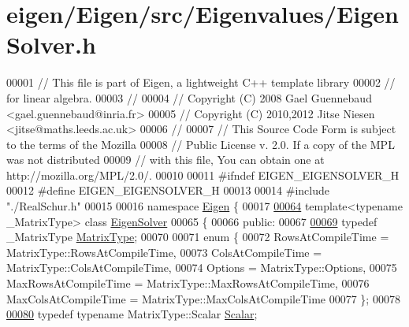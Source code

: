 \hypertarget{eigen_2_eigen_2src_2_eigenvalues_2_eigen_solver_8h_source}{}\section{eigen/\+Eigen/src/\+Eigenvalues/\+Eigen\+Solver.h}
\label{eigen_2_eigen_2src_2_eigenvalues_2_eigen_solver_8h_source}

\begin{DoxyCode}
00001 \textcolor{comment}{// This file is part of Eigen, a lightweight C++ template library}
00002 \textcolor{comment}{// for linear algebra.}
00003 \textcolor{comment}{//}
00004 \textcolor{comment}{// Copyright (C) 2008 Gael Guennebaud <gael.guennebaud@inria.fr>}
00005 \textcolor{comment}{// Copyright (C) 2010,2012 Jitse Niesen <jitse@maths.leeds.ac.uk>}
00006 \textcolor{comment}{//}
00007 \textcolor{comment}{// This Source Code Form is subject to the terms of the Mozilla}
00008 \textcolor{comment}{// Public License v. 2.0. If a copy of the MPL was not distributed}
00009 \textcolor{comment}{// with this file, You can obtain one at http://mozilla.org/MPL/2.0/.}
00010 
00011 \textcolor{preprocessor}{#ifndef EIGEN\_EIGENSOLVER\_H}
00012 \textcolor{preprocessor}{#define EIGEN\_EIGENSOLVER\_H}
00013 
00014 \textcolor{preprocessor}{#include "./RealSchur.h"}
00015 
00016 \textcolor{keyword}{namespace }\hyperlink{namespace_eigen}{Eigen} \{ 
00017 
\hyperlink{group___eigenvalues___module}{00064} \textcolor{keyword}{template}<\textcolor{keyword}{typename} \_MatrixType> \textcolor{keyword}{class }\hyperlink{group___eigenvalues___module_class_eigen_1_1_eigen_solver}{EigenSolver}
00065 \{
00066   \textcolor{keyword}{public}:
00067 
\hyperlink{group___eigenvalues___module_a83acd180404ddaac8a678fa65a6b632b}{00069}     \textcolor{keyword}{typedef} \_MatrixType \hyperlink{group___eigenvalues___module_a83acd180404ddaac8a678fa65a6b632b}{MatrixType};
00070 
00071     \textcolor{keyword}{enum} \{
00072       RowsAtCompileTime = MatrixType::RowsAtCompileTime,
00073       ColsAtCompileTime = MatrixType::ColsAtCompileTime,
00074       Options = MatrixType::Options,
00075       MaxRowsAtCompileTime = MatrixType::MaxRowsAtCompileTime,
00076       MaxColsAtCompileTime = MatrixType::MaxColsAtCompileTime
00077     \};
00078 
\hyperlink{group___eigenvalues___module_a017d49fe0d59874b70a2fcf35e5aa373}{00080}     \textcolor{keyword}{typedef} \textcolor{keyword}{typename} MatrixType::Scalar \hyperlink{group___eigenvalues___module_a017d49fe0d59874b70a2fcf35e5aa373}{Scalar};

\end{DoxyCode}

